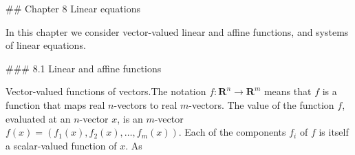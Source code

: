 

## Chapter 8 Linear equations

In this chapter we consider vector-valued linear and affine functions, and systems of linear equations.

### 8.1 Linear and affine functions

Vector-valued functions of vectors.The notation \(f:\mathbf{R}^{n}\to\mathbf{R}^{m}\) means that \(f\) is a function that maps real \(n\)-vectors to real \(m\)-vectors. The value of the function \(f\), evaluated at an \(n\)-vector \(x\), is an \(m\)-vector \(f(x)=(f_{1}(x),f_{2}(x),\ldots,f_{m}(x))\). Each of the components \(f_{i}\) of \(f\) is itself a scalar-valued function of \(x\). As